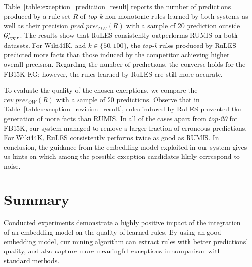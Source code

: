 Table~\ref{table:exception_prediction_result} reports the number of predictions produced by a rule set $R$ of %
\textit{top-k} non-monotonic rules learned %
by both systems as well as %
their precision $pred\_prec_{OW}(R)$ with a sample of 20 prediction outside $\mathcal{G}^i_{appr}$. The results show that RuLES consistently outperforms RUMIS %
on both datasets. For Wiki44K, and $k\in\{50,100\}$, the \textit{top-k} rules produced by RuLES predicted more facts than those induced by the competitor %
achieving %
higher overall precision. 
Regarding the number of predictions, the converse holds for the FB15K KG; however, the rules learned by RuLES are still more accurate.

To evaluate the quality of the chosen exceptions, we compare the $rev\_prec_{OW}(R)$ with a sample of 20 predictions. %
Observe that in Table~\ref{table:exception_revision_result}, rules induced by RuLES prevented the generation of more facts than RUMIS. %
In all of the cases apart from \textit{top-20} for FB15K, our system %
managed to remove %
a larger fraction of erroneous predictions. %
For Wiki44K, RuLES consistently performs twice as good as RUMIS. 
In conclusion, the guidance from the embedding model %
exploited in our system %
gives us hints on which among the possible exception candidates likely correspond to noise.   

\section{Summary}
Conducted experiments demonstrate a highly positive impact of the integration of an embedding model on the quality of learned rules. By using an good embedding model, our mining algorithm can extract rules with better predictions' quality, and also capture more meaningful exceptions in comparison with standard methods. 




